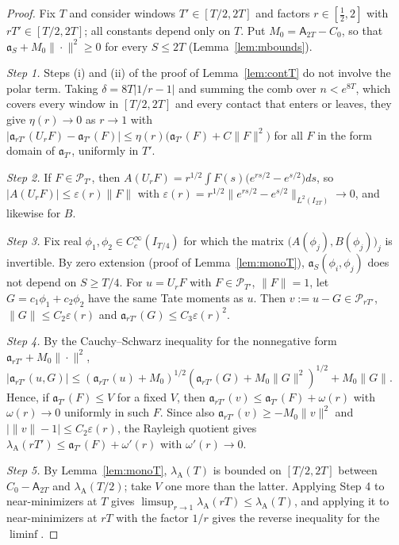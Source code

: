 \documentclass[11pt]{amsart}
\theoremstyle{definition}
\theoremstyle{remark}
\newcommand{\lamA}{\lambda_{\mathrm A}(T)}
\begin{document}
\begin{proof}
Fix $T$ and consider windows $T'\in[T/2,2T]$ and factors $r\in[\frac12,2]$ with $rT'\in[T/2,2T]$; all
constants depend only on $T$. Put $M_0=\mathsf A_{2T}-C_0$, so that $\mathfrak a_S+M_0\|\cdot\|^2\ge0$
for every $S\le2T$ (Lemma~\ref{lem:mbounds}).

\emph{Step 1.} Steps (i) and (ii) of the proof of Lemma~\ref{lem:contT} do not involve the polar term.
Taking $\delta=8T|1/r-1|$ and summing the comb over $n<e^{8T}$, which covers every window in
$[T/2,2T]$ and every contact that enters or leaves, they give $\eta(r)\to0$ as $r\to1$ with
$|\mathfrak a_{rT'}(U_rF)-\mathfrak a_{T'}(F)|\le\eta(r)\big(\mathfrak a_{T'}(F)+C\|F\|^2\big)$ for all
$F$ in the form domain of $\mathfrak a_{T'}$, uniformly in $T'$.

\emph{Step 2.} If $F\in\mathcal P_{T'}$, then $A(U_rF)=r^{1/2}\int F(s)\big(e^{rs/2}-e^{s/2}\big)ds$,
so $|A(U_rF)|\le\varepsilon(r)\|F\|$ with $\varepsilon(r)=r^{1/2}\|e^{rs/2}-e^{s/2}\|_{L^2(I_{2T})}\to0$,
and likewise for $B$.

\emph{Step 3.} Fix real $\phi_1,\phi_2\in C_c^\infty(I_{T/4})$ for which the matrix
$\big(A(\phi_j),B(\phi_j)\big)_{j}$ is invertible. By zero extension (proof of Lemma~\ref{lem:monoT}),
$\mathfrak a_S(\phi_i,\phi_j)$ does not depend on $S\ge T/4$. For $u=U_rF$ with $F\in\mathcal P_{T'}$,
$\|F\|=1$, let $G=c_1\phi_1+c_2\phi_2$ have the same Tate moments as $u$. Then
$v:=u-G\in\mathcal P_{rT'}$, $\|G\|\le C_2\varepsilon(r)$ and $\mathfrak a_{rT'}(G)\le C_3\varepsilon(r)^2$.

\emph{Step 4.} By the Cauchy--Schwarz inequality for the nonnegative form
$\mathfrak a_{rT'}+M_0\|\cdot\|^2$,
$|\mathfrak a_{rT'}(u,G)|\le(\mathfrak a_{rT'}(u)+M_0)^{1/2}(\mathfrak a_{rT'}(G)+M_0\|G\|^2)^{1/2}+M_0\|G\|$.
Hence, if $\mathfrak a_{T'}(F)\le V$ for a fixed $V$, then
$\mathfrak a_{rT'}(v)\le\mathfrak a_{T'}(F)+\omega(r)$ with $\omega(r)\to0$ uniformly in such $F$. Since
also $\mathfrak a_{rT'}(v)\ge-M_0\|v\|^2$ and $\big|\|v\|-1\big|\le C_2\varepsilon(r)$, the Rayleigh
quotient gives $\lambda_{\mathrm A}(rT')\le\mathfrak a_{T'}(F)+\omega'(r)$ with
$\omega'(r)\to0$.

\emph{Step 5.} By Lemma~\ref{lem:monoT}, $\lamA$ is bounded on $[T/2,2T]$ between $C_0-\mathsf A_{2T}$
and $\lambda_{\mathrm A}(T/2)$; take $V$ one more than the latter. Applying Step 4 to
near-minimizers at $T$ gives $\limsup_{r\to1}\lambda_{\mathrm A}(rT)\le\lamA$, and applying
it to near-minimizers at $rT$ with the factor $1/r$ gives the reverse inequality for the $\liminf$.
\end{proof}
\end{document}

